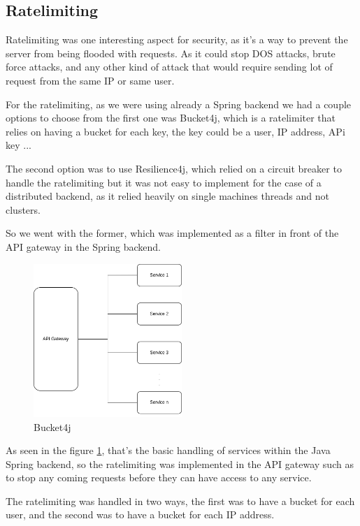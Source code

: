 \subsection {Ratelimiting}

Ratelimiting was one interesting aspect for security, as it's a way to prevent the
server from being flooded with requests. As it could stop DOS attacks, brute force
attacks, and any other kind of attack that would require sending lot of request from 
the same IP or same user.

For the ratelimiting, as we were using already a Spring backend we had a couple options
to choose from the first one was Bucket4j, which is a ratelimiter that relies on having
a bucket for each key, the key could be a user, IP address, APi key ...

The second option was to use Resilience4j, which relied on a circuit breaker to
handle the ratelimiting but it was not easy to implement for the case of a distributed
backend, as it relied heavily on single machines threads and not clusters.

So we went with the former, which was implemented as a filter in front of the API gateway
in the Spring backend.

\begin{figure}[!htbp]
    \centering
    \includegraphics[width=0.5\textwidth]{images/ratelimiting.png} 
    \caption{\footnotesize{Bucket4j}}
    \label{fig:bucket4j}
\end{figure}


As seen in the figure \ref{fig:bucket4j}, that's the basic handling of services within the
Java Spring backend, so the ratelimiting was implemented in the API gateway such as to
stop any coming requests before they can have access to any service.

The ratelimiting was handled in two ways, the first was to have a bucket for each user,
and the second was to have a bucket for each IP address.

